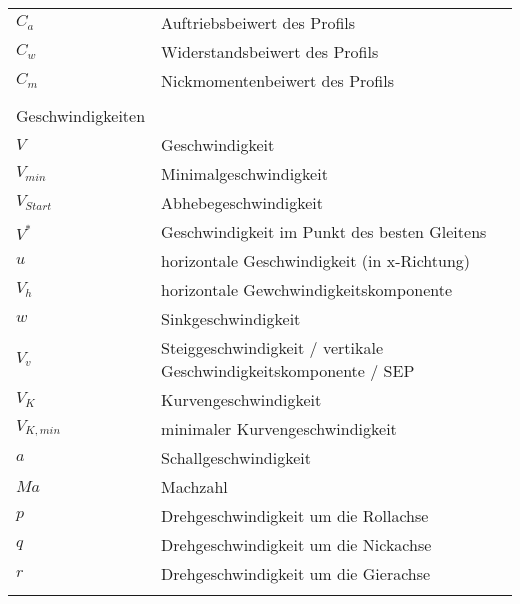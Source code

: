 \begin{table}[H]
\begin{tabular}{ll}
		$C_{a}$				& Auftriebsbeiwert des Profils\\
		$C_{w}$				& Widerstandsbeiwert des Profils\\
		$C_{m}$				& Nickmomentenbeiwert des Profils\\
		\\
		Geschwindigkeiten\\
		\hline
		$V$					& Geschwindigkeit\\
		$V_{min}$			& Minimalgeschwindigkeit\\
		$V_{Start}$			& Abhebegeschwindigkeit\\
		$V^*$				& Geschwindigkeit im Punkt des besten Gleitens\\
		$u$					& horizontale Geschwindigkeit (in x-Richtung)\\
		$V_h$				& horizontale Gewchwindigkeitskomponente\\
		$w$					& Sinkgeschwindigkeit\\
		$V_v$				& Steiggeschwindigkeit / vertikale Geschwindigkeitskomponente / SEP\\
		$V_K$				& Kurvengeschwindigkeit\\
		$V_{K,min}$			& minimaler Kurvengeschwindigkeit\\
		$a$					& Schallgeschwindigkeit\\
		$Ma$				& Machzahl\\
		$p$					& Drehgeschwindigkeit um die Rollachse\\
		$q$					& Drehgeschwindigkeit um die Nickachse\\
		$r$					& Drehgeschwindigkeit um die Gierachse\\
		\\
	\end{tabular}
\end{table}
